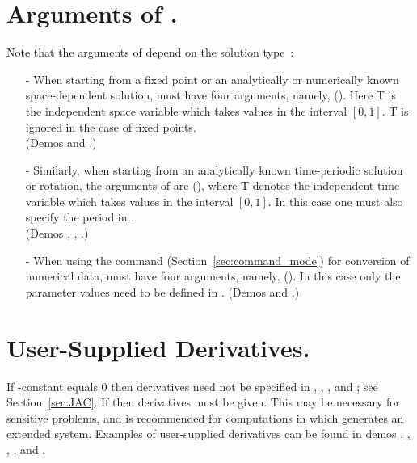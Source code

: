 \section{ Arguments of .} \label{sec:Arguments_of_STPNT}
Note that the arguments of  depend on the solution type~:
\begin{itemize}
\item[-]
  When starting from a fixed point or an analytically or numerically known space-dependent 
  solution,  must have four arguments, namely, 
().
  Here T is the independent space variable which
  takes values in the interval $[0,1]$.  T is ignored in 
  the case of fixed points.\\ 
  (Demos  and .)
\item[-]
  Similarly, when starting from an analytically known 
  time-periodic solution or rotation, the arguments of  are
  (), where T denotes the independent time variable which
  takes values in the interval $[0,1]$.
  In this case one must also specify the period in . \\  
  (Demos , , .)
\item[-]
  When using the  command (Section~\ref{sec:command_mode})
  for conversion of numerical data,
   must have four arguments, namely, ().
  In this case only the parameter values need to be defined in .
  (Demos  and .)
\end{itemize}
 
\section{ User-Supplied Derivatives.} \label{sec:derivatives}
If \AUTO-constant  equals 0 
then derivatives need not be specified in 
, , , and ; see Section~\ref{sec:JAC}.
If  then derivatives must be given.
This may be necessary for sensitive 
problems, and is recommended for computations in which \AUTO 
generates an extended system.
Examples of user-supplied derivatives can be found in
demos  , , , , and .

